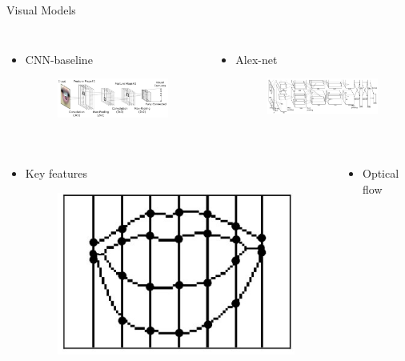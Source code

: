 \documentclass{beamer}
\begin{document}
\begin{frame}{Visual Models}
    \begin{columns}[T]
    \begin{itemize}
        \item CNN-baseline
        \begin{figure}
        \includegraphics[width=.9\textwidth]{fig/cnnOriginal.jpg}   
        \end{figure}
    \end{itemize}
    \begin{itemize}
        \item Alex-net 
        \begin{figure}
        \includegraphics[width=.9\textwidth]{fig/alexNet.jpg}   
        \end{figure}
    \end{itemize}
    \end{columns}
    \begin{columns}[T]
    \begin{itemize}
        \item Key features 
        \begin{figure}
        \includegraphics[width=.5\textwidth]{fig/keyFeature.jpg}   
        \end{figure}
    \end{itemize}
    \begin{itemize}
        \item Optical flow
    \end{itemize}
    \end{columns}
\end{frame}
\end{document}
